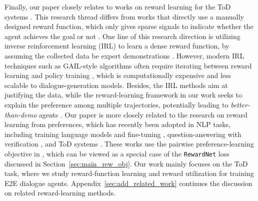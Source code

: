 Finally, 
our paper closely relates to works on reward learning for the ToD systems \citep[\eg,][]{takanobu2019guided,caspi2021}.
This research thread differs from works that directly use a manually designed reward function, 
which only gives sparse signals to indicate whether the agent achieves the goal or not \citep[\eg,][]{weisz2018sample,wu2019switch,gptcritic2022,snell2022context}. 
One line of this research direction is utilizing inverse reinforcement learning (IRL) \citep{russell1998learning} to learn a dense reward function, 
by assuming the collected data be expert demonstrations \citep{takanobu2019guided}. 
However, modern IRL techniques such as GAIL-style algorithms \citep{ho2016generative,fu2017learning} often require iterating between reward learning and policy training \citep{finn2016connection}, which is computationally expensive and less scalable to dialogue-generation models.
Besides, the IRL methods aim at justifying the data, while the reward-learning framework in our work seeks to explain the preference among multiple trajectories, potentially leading to \textit{better-than-demo} agents \citep{trex2019,drex2020}.
Our paper is more closely related to the research on reward learning from preferences,
which has recently been adopted in NLP tasks, including training language models \citep{fan2020bayesian, ouyang2022training} and fine-tuning \citep{ziegler2019fine, zhang2021learning, zhang2022allsh},
question-answering with verification \citep{nakano2021webgpt,zhang2021knowing, menick2022teaching, zhang2022passage}, 
and ToD systems \citep{caspi2021}.
These works use the pairwise preference-learning objective in \citet{christiano2017deep}, which can be viewed as a special case of the \texttt{RewardNet} loss discussed in Section~\ref{sec:main_rew_obj}.  
Our work mainly focuses on the ToD task, where we study reward-function learning and reward utilization for training E2E dialogue agents. 
Appendix~\ref{sec:add_related_work} continues the discussion on related reward-learning methods.








